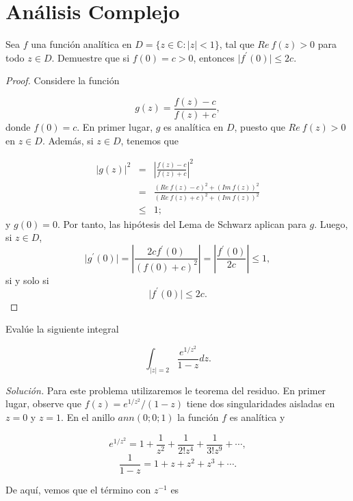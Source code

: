 \documentclass[12pt]{article}
\newcommand{\C}{\mathbb{C}}
\newenvironment{problem}[2][Problema]{\begin{trivlist}
\item[\hskip \labelsep {\bfseries #1}\hskip \labelsep {\bfseries #2.}]}{\end{trivlist}}
\begin{document}
\section*{Análisis Complejo}

\text{ }

\begin{problem}{2, febrero 2014}
Sea $f$ una función analítica en $D = \{z \in \C : \lvert z \rvert < 1 \}$, tal que $Re \ f(z) > 0$ para todo $z \in D$. Demuestre que si $f(0) = c > 0$, entonces $\lvert f^\prime(0) \rvert \leq 2c.$
\end{problem}
\begin{proof}
Considere la función 

$$ g(z) = \frac{f(z)-c}{f(z)+c},$$ donde $f(0) = c.$ En primer lugar, $g$ es analítica en $D$, puesto que $Re \ f(z) > 0$ en $z \in D.$ Además, si $z \in D$, tenemos que

\begin{eqnarray*}
\lvert g(z) \rvert^2 &=& \left| \frac{f(z) - c}{f(z) + c} \right|^2 \\
&=& \frac{(Re \ f(z)-c)^2 + (Im \ f(z))^2 }{(Re \ f(z) + c)^2 + (Im \ f(z))^2}\\
&\leq& 1; 
\end{eqnarray*}
y $g(0) = 0.$ Por tanto, las hipótesis del Lema de Schwarz aplican para $g$. Luego, si $z \in D$,
$$\lvert g^\prime(0) \rvert = \left\lvert \frac{2c f^\prime(0)}{(f(0) + c)^2} \right\rvert = \left\lvert \frac{f^\prime(0)}{2c} \right\rvert \leq 1,$$
si y solo si 
$$\lvert f^\prime(0) \rvert  \leq 2c.$$
\end{proof}



\begin{problem}{3, febrero 2014}
Evalúe la siguiente integral

$$\int_{\lvert z \rvert = 2} \frac{e^{1/z^2}}{1-z} dz.$$
\end{problem}
\textit{Solución.} Para este problema utilizaremos le teorema del residuo. En primer lugar, observe que $f(z) = e^{1/z^2}/(1-z)$ tiene dos singularidades aisladas en $z=0$ y $z=1.$ En el anillo $ann(0; 0; 1)$ la función $f$ es analítica y

$$e^{1/z^2} = 1 + \frac{1}{z^2} + \frac{1}{2! z^4} + \frac{1}{3! z^9} + \cdots,$$
$$\frac{1}{1-z} = 1 + z + z^2 + z^3 + \cdots. $$

De aquí, vemos que el término con $z^{-1}$ es
\end{document}
